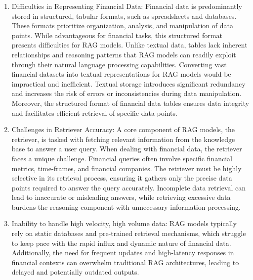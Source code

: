 \begin{enumerate}
    \item Difficulties in Representing Financial Data: Financial data is predominantly stored in structured, tabular formats, such as spreadsheets and databases. These formats prioritize organization, analysis, and manipulation of data points. While advantageous for financial tasks, this structured format presents difficulties for RAG models. Unlike textual data, tables lack inherent relationships and reasoning patterns that RAG models can readily exploit through their natural language processing capabilities. Converting vast financial datasets into textual representations for RAG models would be impractical and inefficient. Textual storage introduces significant redundancy and increases the risk of errors or inconsistencies during data manipulation. Moreover, the structured format of financial data tables ensures data integrity and facilitates efficient retrieval of specific data points.
    \item Challenges in Retriever Accuracy: A core component of RAG models, the retriever, is tasked with fetching relevant information from the knowledge base to answer a user query. When dealing with financial data, the retriever faces a unique challenge. Financial queries often involve specific financial metrics, time-frames, and financial companies. The retriever must be highly selective in its retrieval process, ensuring it gathers only the precise data points required to answer the query accurately. Incomplete data retrieval can lead to inaccurate or misleading answers, while retrieving excessive data burdens the reasoning component with unnecessary information processing.
    \item Inability to handle high velocity, high volume data: RAG models typically rely on static databases and pre-trained retrieval mechanisms, which struggle to keep pace with the rapid influx and dynamic nature of financial data. Additionally, the need for frequent updates and high-latency responses in financial contexts can overwhelm traditional RAG architectures, leading to delayed and potentially outdated outputs.
\end{enumerate}


